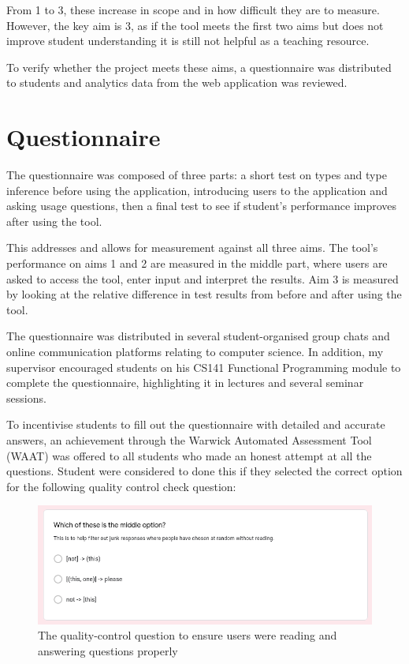 \documentclass[a4paper,fleqn,oneside,12pt]{report}
\begin{document}
From 1 to 3, these increase in scope and in how difficult they are to measure. However, the key aim is 3, as if the tool meets the first two aims but does not improve student understanding it is still not helpful as a teaching resource.

To verify whether the project meets these aims, a questionnaire was distributed to students and analytics data from the web application was reviewed.

\section{Questionnaire}\label{id:h.yqiowsgjmohq}

The questionnaire was composed of three parts: a short test on types and type inference before using the application, introducing users to the application and asking usage questions, then a final test to see if student’s performance improves after using the tool.

This addresses and allows for measurement against all three aims. The tool’s performance on aims 1 and 2 are measured in the middle part, where users are asked to access the tool, enter input and interpret the results. Aim 3 is measured by looking at the relative difference in test results from before and after using the tool.

The questionnaire was distributed in several student-organised group chats and online communication platforms relating to computer science. In addition, my supervisor encouraged students on his CS141 Functional Programming module to complete the questionnaire, highlighting it in lectures and several seminar sessions.

To incentivise students to fill out the questionnaire with detailed and accurate answers, an achievement through the Warwick Automated Assessment Tool (WAAT) was offered to all students who made an honest attempt at all the questions. Student were considered to done this if they selected the correct option for the following quality control check question:

{\centering \begin{figure}[h!]
  \centering
  \includegraphics[width=0.9\linewidth]{images/image32.png}
  \caption{The quality-control question to ensure users were reading and answering questions properly}
\end{figure} \par}
\end{document}
